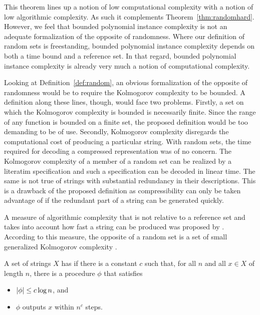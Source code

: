 This theorem lines up a notion of low computational complexity with a notion of low algorithmic complexity.
As such it complements Theorem~\ref{thm:randomhard}.
However, we feel that bounded polynomial instance complexity is not an adequate formalization of the opposite of randomness.
Where our definition of random sets is freestanding, bounded polynomial instance complexity depends on both a time bound and a reference set.
In that regard, bounded polynomial instance complexity is already very much a notion of computational complexity.

Looking at Definition~\ref{def:random}, an obvious formalization of the opposite of randomness would be to require the Kolmogorov complexity to be bounded.
A definition along these lines, though, would face two problems.
Firstly, a set on which the Kolmogorov complexity is bounded is necessarily finite.
Since the range of any function is bounded on a finite set, the proposed definition would be too demanding to be of use.
Secondly, Kolmogorov complexity disregards the computational cost of producing a particular string.
With random sets, the time required for decoding a compressed representation was of no concern.
The Kolmogorov complexity of a member of a random set can be realized by a literatim specification and such a specification can be decoded in linear time.
The same is not true of strings with substantial redundancy in their descriptions.
This is a drawback of the proposed definition as compressibility can only be taken advantage of if the redundant part of a string can be generated quickly.

A measure of algorithmic complexity that is not relative to a reference set and takes into account how fast a string can be produced was proposed by \textcite{hartmanis1983generalized}.
According to this measure, the opposite of a random set is a set of small generalized Kolmogorov complexity \parencite{balcazar1986sets,allender1988p-printable}.
\begin{definition}
  A set of strings $X$ has  if there is a constant $c$ such that, for all $n$ and all $x \in X$ of length $n$, there is a procedure $\phi$ that satisfies
  \begin{itemize}
  \item ${\lvert\phi\rvert} \le c\log n$, and
  \item $\phi$ outputs $x$ within $n^c$ steps.
  \end{itemize}
\end{definition}

